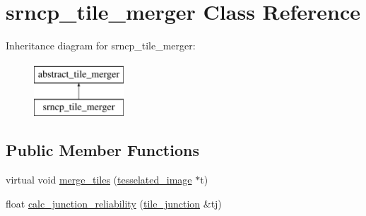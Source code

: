 \hypertarget{classsrncp__tile__merger}{\section{srncp\-\_\-tile\-\_\-merger Class Reference}
\label{classsrncp__tile__merger}
}
Inheritance diagram for srncp\-\_\-tile\-\_\-merger\-:\begin{figure}[H]
\begin{center}
\leavevmode
\includegraphics[height=2.000000cm]{classsrncp__tile__merger}
\end{center}
\end{figure}
\subsection*{Public Member Functions}
\begin{DoxyCompactItemize}
\item 
virtual void \hyperlink{classsrncp__tile__merger_a8513af3c4d4dd03ef9b50973edafb01b}{merge\-\_\-tiles} (\hyperlink{classtesselated__image}{tesselated\-\_\-image} $\ast$t)
\item 
float \hyperlink{classsrncp__tile__merger_a10d3405b6fd22f74bde75322cc0c8311}{calc\-\_\-junction\-\_\-reliability} (\hyperlink{classtile__junction}{tile\-\_\-junction} \&tj)
\end{DoxyCompactItemize}
